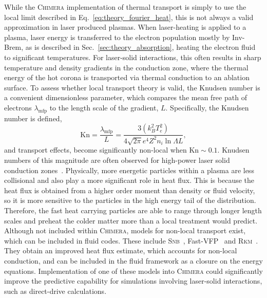 While the \textsc{Chimera} implementation of thermal transport is simply to use the local limit described in Eq.~\ref{eq:theory_fourier_heat}, this is not always a valid approximation in laser produced plasmas.
When laser-heating is applied to a plasma, laser energy is transferred to the electron population mostly by \ac{Inv-Brem}, as is described in Sec.~\ref{sec:theory_absorption}, heating the electron fluid to significant temperatures.
For laser-solid interactions, this often results in sharp temperature and density gradients in the conduction zone, where the thermal energy of the hot corona is transported via thermal conduction to an ablation surface.
To assess whether local transport theory is valid, the Knudsen number is a convenient dimensionless parameter, which compares the mean free path of electrons $\lambda_{\text{mfp}}$ to the length scale of the gradient, $L$.
Specifically, the Knudsen number is defined,
\begin{equation}
    \text{Kn} = \frac{\lambda_{\text{mfp}}}{L} = \frac{3 (k_B^2 T_e^2)}{4 \sqrt{2\pi} e^4 Z^2 n_i \ln{\Lambda} L},
\end{equation}
and transport effects, become significantly non-local when $\text{Kn}\sim0.1$.
Knudsen numbers of this magnitude are often observed for high-power laser solid conduction zones~\cite{yuan_spacetime_2024}.
Physically, more energetic particles within a plasma are less collisional and also play a more significant role in heat flux.
This is because the heat flux is obtained from a higher order moment than density or fluid velocity, so it is more sensitive to the particles in the high energy tail of the distribution.
Therefore, the fast heat carrying particles are able to range through longer length scales and preheat the colder matter more than a local treatment would predict.
Although not included within \textsc{Chimera}, models for non-local transport exist, which can be included in fluid codes.
These include \textsc{Snb}~\cite{schurtz_nonlocal_2000,nicolai_practical_2006,cao_improved_2015,sherlock_comparison_2017}, Fast-\textsc{VFP}~\cite{bell_fast_2024} and \textsc{Rkm}~\cite{mitchell_reduced_2024}.
They obtain an improved heat flux estimate, which accounts for non-local conduction, and can be included in the fluid framework as a closure on the energy equations.
Implementation of one of these models into \textsc{Chimera} could significantly improve the predictive capability for simulations involving laser-solid interactions, such as direct-drive calculations.

